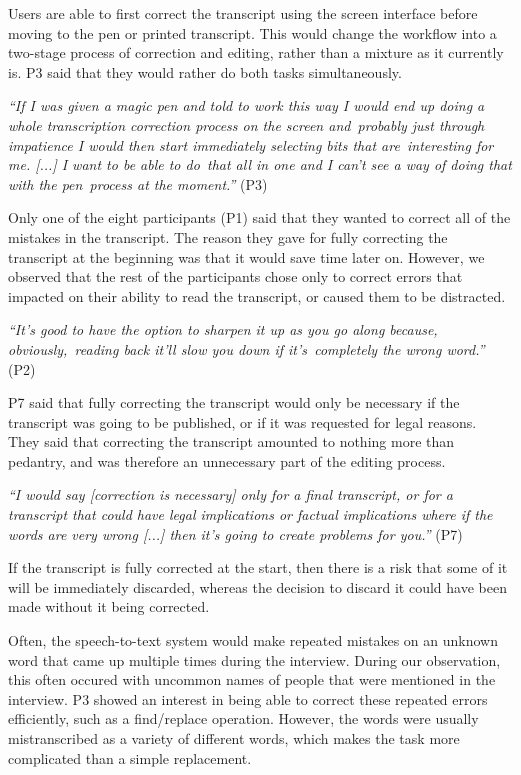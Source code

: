 Users are able to first correct the transcript using the screen interface before moving to the pen or printed
transcript.  This would change the workflow into a two-stage process of correction and editing, rather than a mixture
as it currently is. P3 said that they would rather do both tasks simultaneously.

\textit{``If I was given a magic pen and told to work this way I would end up doing a whole transcription correction
process on the screen and probably just through impatience I would then start immediately selecting bits that
are interesting for me. [...] I want to be able to do that all in one and I can't see a way of doing that with the
pen process at the moment.''} (P3)

Only one of the eight participants (P1) said that they wanted to correct all of the mistakes in the transcript. The
reason they gave for fully correcting the transcript at the beginning was that it would save time later on. However,
we observed that the rest of the participants chose only to correct errors that impacted on their ability to read the
transcript, or caused them to be distracted.

\textit{``It's good to have the option to sharpen it up as you go along because, obviously, reading back it'll slow
you down if it's completely the wrong word.''} (P2)

P7 said that fully correcting the transcript would only be necessary if the transcript was going to be
published, or if it was requested for legal reasons. They said that correcting the transcript amounted to nothing more
than pedantry, and was therefore an unnecessary part of the editing process.

\textit{``I would say [correction is necessary] only for a final transcript, or for a transcript that could have legal
  implications or factual implications where if the words are very wrong [...]
then it's going to create problems for you.''} (P7)

If the transcript is fully corrected at the start, then there is a risk that some of it will be immediately discarded,
whereas the decision to discard it could have been made without it being corrected.



Often, the speech-to-text system would make repeated mistakes on an unknown word that came up multiple times during the
interview. During our observation, this often occured with uncommon names of people that were mentioned in the
interview. P3 showed an interest in being able to correct these repeated errors efficiently, such as a find/replace
operation. However, the words were usually mistranscribed as a variety of different words, which makes the task more
complicated than a simple replacement.

